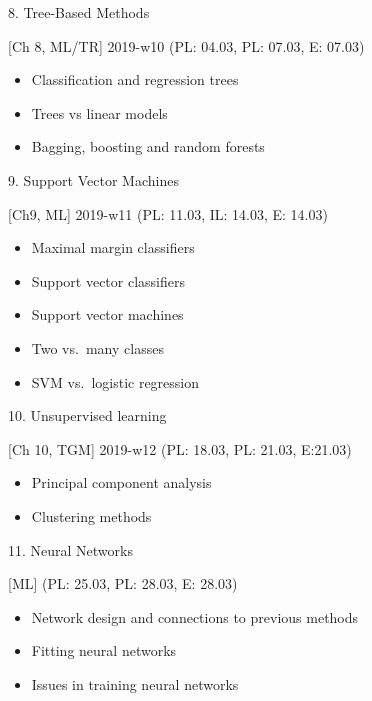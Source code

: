 \documentclass[10pt,ignorenonframetext,]{beamer}
\providecommand{\tightlist}{%
  \setlength{\itemsep}{0pt}\setlength{\parskip}{0pt}}
\begin{document}
\begin{frame}

\begin{block}{8. Tree-Based Methods}

{[}Ch 8, ML/TR{]} 2019-w10 (PL: 04.03, PL: 07.03, E: 07.03)

\begin{itemize}
\tightlist
\item
  Classification and regression trees
\item
  Trees vs linear models
\item
  Bagging, boosting and random forests
\end{itemize}

\end{block}

\begin{block}{9. Support Vector Machines}

{[}Ch9, ML{]} 2019-w11 (PL: 11.03, IL: 14.03, E: 14.03)

\begin{itemize}
\tightlist
\item
  Maximal margin classifiers
\item
  Support vector classifiers
\item
  Support vector machines
\item
  Two vs.~many classes
\item
  SVM vs.~logistic regression
\end{itemize}

\end{block}

\end{frame}

\begin{frame}

\begin{block}{10. Unsupervised learning}

{[}Ch 10, TGM{]} 2019-w12 (PL: 18.03, PL: 21.03, E:21.03)

\begin{itemize}
\tightlist
\item
  Principal component analysis
\item
  Clustering methods
\end{itemize}

\end{block}

\begin{block}{11. Neural Networks}

{[}ML{]} (PL: 25.03, PL: 28.03, E: 28.03)

\begin{itemize}
\tightlist
\item
  Network design and connections to previous methods
\item
  Fitting neural networks
\item
  Issues in training neural networks
\end{itemize}

\end{block}

\end{frame}
\end{document}
